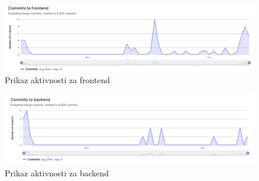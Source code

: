		\begin{figure}[H]
			\includegraphics[width=\textwidth]{slike/frontend.PNG} 
			\caption{Prikaz aktivnosti za frontend}
			\label{fig:Frontend}
		\end{figure}
		
		\begin{figure}[H]
			\includegraphics[width=\textwidth]{slike/backend.PNG} 
			\caption{Prikaz aktivnosti za backend}
			\label{fig:Backend}
		\end{figure}
	
		
	